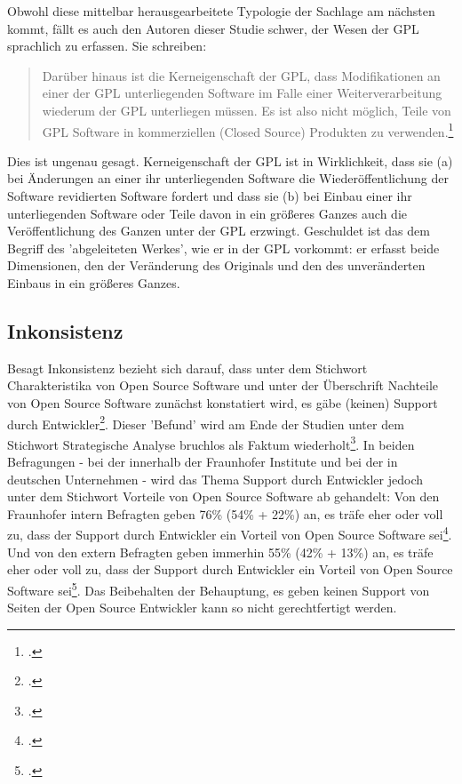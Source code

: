 \documentclass[DIV=calc,BCOR=5mm,11pt,headings=small,oneside,abstract=true, toc=bib]{scrartcl}
\begin{document}
Obwohl diese mittelbar herausgearbeitete Typologie der Sachlage am nächsten
kommt, fällt es auch den Autoren dieser Studie schwer, der Wesen der GPL
sprachlich zu erfassen. Sie schreiben:

\begin{quote}\glqq{}Darüber hinaus ist die Kerneigenschaft der GPL, dass
Modifikationen an einer der GPL unterliegenden Software im Falle einer
Weiterverarbeitung wiederum der GPL unterliegen müssen. Es ist also nicht
möglich, Teile von GPL Software in kommerziellen (Closed Source) Produkten zu
verwenden.\grqq{}\footcite[][20]{RenVetRexKet2005a}
\end{quote}

Dies ist ungenau gesagt. Kerneigenschaft der GPL ist in Wirklichkeit, dass sie
(a) bei Änderungen an einer ihr unterliegenden Software die Wiederöffentlichung
der Software revidierten Software fordert und dass sie (b) bei Einbau einer ihr
unterliegenden Software oder Teile davon in ein größeres Ganzes auch die
Veröffentlichung des Ganzen unter der GPL erzwingt. Geschuldet ist das dem
Begriff des 'abgeleiteten Werkes', wie er in der GPL vorkommt: er erfasst beide
Dimensionen, den der Veränderung des Originals und den des unveränderten Einbaus
in ein größeres Ganzes.

\subsection{Inkonsistenz}

Besagt Inkonsistenz bezieht sich darauf, dass unter dem Stichwort
\glqq{}Charakteristika von Open Source Software\grqq{} und unter der Überschrift
\glqq{}Nachteile von Open Source Software\grqq{} zunächst konstatiert wird, es
gäbe \glqq{}(keinen) Support durch
Entwickler\grqq{}\footcite[vgl.][17]{RenVetRexKet2005a}. Dieser 'Befund' wird am
Ende der Studien unter dem Stichwort \glqq{}Strategische Analyse\grqq{} bruchlos
als Faktum wiederholt\footcite[vgl.][172]{RenVetRexKet2005a}. In beiden
Befragungen - bei der innerhalb der Fraunhofer Institute und bei der in
deutschen Unternehmen - wird das Thema \glqq{}Support durch Entwickler\grqq{}
jedoch unter dem Stichwort \glqq{}Vorteile von Open Source Software\grqq{} ab
gehandelt: Von den Fraunhofer intern Befragten geben 76\% (54\% + 22\%) an, es
träfe eher oder voll zu, dass der \glqq{}Support durch Entwickler\grqq{} ein
\glqq{}Vorteil von Open Source Software\grqq{}
sei\footcite[vgl.][56]{RenVetRexKet2005a}. Und von den extern Befragten geben
immerhin 55\% (42\% + 13\%) an, es träfe eher oder voll zu, dass der
\glqq{}Support durch Entwickler\grqq{} ein \glqq{}Vorteil von Open Source
Software\grqq{} sei\footcite[vgl.][69]{RenVetRexKet2005a}. Das Beibehalten der
Behauptung, es geben keinen Support von Seiten der Open Source Entwickler kann
so nicht gerechtfertigt werden.
\end{document}
